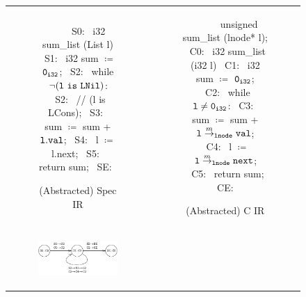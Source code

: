 \begin{figure}[H]
\begin{tabular}{cc}
\begin{subfigure}[b]{0.45\textwidth}
\begin{center}
\begin{allLangEnvFoot}
~{\scriptsize \textcolor{mygray}{   }}~   
~{\scriptsize \textcolor{mygray}{S0:}}~ i32 sum_list (List l) {
~{\scriptsize \textcolor{mygray}{S1:}}~   i32 sum $\coloneqq$ ${\tt 0_{i32}}$;
~{\scriptsize \textcolor{mygray}{S2:}}~   while $\mathrm{\tt\neg (l\ is\ LNil)}$:
~{\scriptsize \textcolor{mygray}{S2:}}~     // (l is LCons);
~{\scriptsize \textcolor{mygray}{S3:}}~     sum $\coloneqq$ sum + ${\tt l.val}$;
~{\scriptsize \textcolor{mygray}{S4:}}~     l   $\coloneqq$ l.next;
~{\scriptsize \textcolor{mygray}{S5:}}~   return sum;
~{\scriptsize \textcolor{mygray}{SE:}}~ }
\end{allLangEnvFoot}
\end{center}
\vspace{-15px}
\caption{\label{fig:llTraverseSpec}(Abstracted) Spec IR}
\end{subfigure}%
&
\begin{subfigure}[b]{0.55\textwidth}
\begin{center}
\begin{allLangEnvFoot}
~{\scriptsize \textcolor{mygray}{\ \ \ }}~ unsigned sum_list (lnode* l);
~{\scriptsize \textcolor{mygray}{C0:}}~ i32 sum_list (i32 l) {
~{\scriptsize \textcolor{mygray}{C1:}}~   i32 sum $\coloneqq$ ${\tt 0_{i32}}$;
~{\scriptsize \textcolor{mygray}{C2:}}~   while ${\tt l \neq 0_{i32}}$:
~{\scriptsize \textcolor{mygray}{C3:}}~     sum $\coloneqq$ sum + ${\tt \tt l} \overset{m}{\rightarrow}_{\tt lnode} {\tt val}$;
~{\scriptsize \textcolor{mygray}{C4:}}~     l   $\coloneqq$ ${\tt \tt l} \overset{m}{\rightarrow}_{\tt lnode} {\tt next}$;
~{\scriptsize \textcolor{mygray}{C5:}}~   return sum;
~{\scriptsize \textcolor{mygray}{CE:}}~ }
\end{allLangEnvFoot}
\end{center}
\vspace{-15px}
\caption{\label{fig:llTraverseC}(Abstracted) C IR}
\end{subfigure}%
\\
\begin{subfigure}[b]{0.50\textwidth}
\begin{center}
{\includegraphics[scale=1.2]{chapters/figures/figSumListProductCfg.pdf}}

\end{center}
\end{subfigure}
\end{tabular}
\end{figure}
